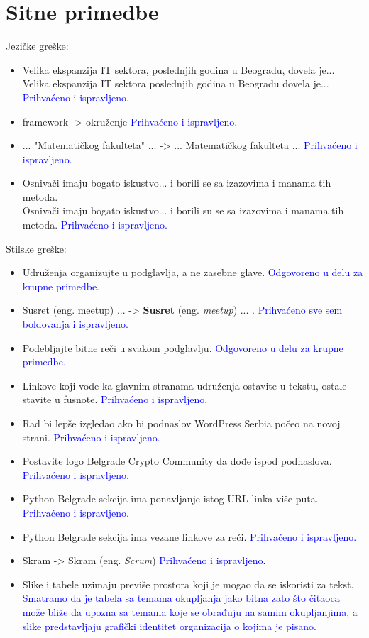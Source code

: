 \documentclass[a4paper]{report}
\newcommand{\odgovor}[1]{\textcolor{blue}{#1}}
\begin{document}
\section{Sitne primedbe}
Jezičke greške: \begin{itemize}
\item Velika ekspanzija IT sektora, poslednjih godina u Beogradu, dovela je...\\
      Velika ekspanzija IT sektora poslednjih godina u Beogradu dovela je...
      \odgovor{Prihvaćeno i ispravljeno.}
\item framework -> okruženje 
\odgovor{Prihvaćeno i ispravljeno.}
\item ... "Matematičkog fakulteta" ... -> ... Matematičkog fakulteta ... 
\odgovor{Prihvaćeno i ispravljeno.}
\item Osnivači imaju bogato iskustvo... i borili se sa izazovima i manama tih metoda. \\
      Osnivači imaju bogato iskustvo... i borili su se sa izazovima i manama tih metoda.
       \odgovor{Prihvaćeno i ispravljeno.}
\end{itemize}

Stilske greške:\begin{itemize}
\item Udruženja organizujte u podglavlja, a ne zasebne glave.
\odgovor{Odgovoreno u delu za krupne primedbe.}
\item Susret (eng. meetup) ... -> \textbf{Susret} (eng. \textit{meetup}) ... .
\odgovor{Prihvaćeno sve sem boldovanja i ispravljeno.}
\item Podebljajte bitne reči u svakom podglavlju.
\odgovor{Odgovoreno u delu za krupne primedbe.}
\item Linkove koji vode ka glavnim stranama udruženja ostavite u tekstu, ostale stavite u fusnote.
\odgovor{Prihvaćeno i ispravljeno.}
\item Rad bi lepše izgledao ako bi podnaslov WordPress Serbia počeo na novoj strani.
\odgovor{Prihvaćeno i ispravljeno.}
\item Postavite logo Belgrade Crypto Community da dođe ispod podnaslova.
\odgovor{Prihvaćeno i ispravljeno.}
\item Python Belgrade sekcija ima ponavljanje istog URL linka više puta.
\odgovor{Prihvaćeno i ispravljeno.}
\item Python Belgrade sekcija ima vezane linkove za reči.
\odgovor{Prihvaćeno i ispravljeno.}
\item Skram -> Skram (eng. \textit{Scrum})
\odgovor{Prihvaćeno i ispravljeno.}
\item Slike i tabele uzimaju previše prostora koji je mogao da se iskoristi za tekst.
\odgovor{Smatramo da je tabela sa temama okupljanja jako bitna zato što čitaoca može bliže da upozna sa temama koje se obrađuju na samim okupljanjima, a slike predstavljaju grafički identitet organizacija o kojima je pisano.}

\end{itemize}
\end{document}
